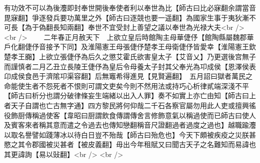 有功效不可以為後灋即封奉世開後奉使者利以奉世為比【師古曰比必寐翻余謂當音毘寐翻】爭逐發兵要功萬里之外【師古曰逐競也要一遥翻】為國家生事于夷狄漸不可長【為于偽翻長知兩翻】奉世不宜受封上善望之議以奉世為光禄大夫<br />
<br />
　　二年春正月赦天下　上欲立皇后時館陶主母華倢伃【館陶縣屬魏郡華戶化翻倢伃音接予下同】及淮陽憲王母張倢伃楚孝王母衛倢伃皆愛幸【淮陽憲王欽楚孝王嚻】上欲立張倢伃為后久之懲艾霍氏欲害皇太子【艾音乂】乃更選後宫無子而謹慎者二月乙丑立長陵王倢伃為皇后令母養太子封其父奉光為卭成侯【恩澤侯表卬成侯食邑于濟隂卭渠容翻】后無竈希得進見【見賢遍翻】　五月詔曰獄者萬民之命能使生者不怨死者不恨則可謂文吏矣今則不然用法或持巧心析律貳端深淺不平【師古曰析分也謂分破律條妄生端緒以出入人罪】奏不如實上亦亡由知【師古曰上者天子自謂也亡古無字通】四方黎民將何仰哉二千石各察官屬勿用此人吏或擅興徭役飾厨傳稱過使客【韋昭曰厨謂飲食傳謂傳舍言修飾意氣以稱過使而已師古曰使人及賓客來者稱其意而遣之令過去也傳知戀翻稱音尺證翻過者過度之過也】越職踰灋以取名譽譬如踐薄冰以待白日豈不殆哉【師古曰殆危也】今天下頗被疾疫之災朕甚愍之其令郡國被災甚者【被皮義翻】毋出今年租賦又曰聞古天子之名難知而易諱也其更諱詢【易以䜴翻】<br />
<br />
